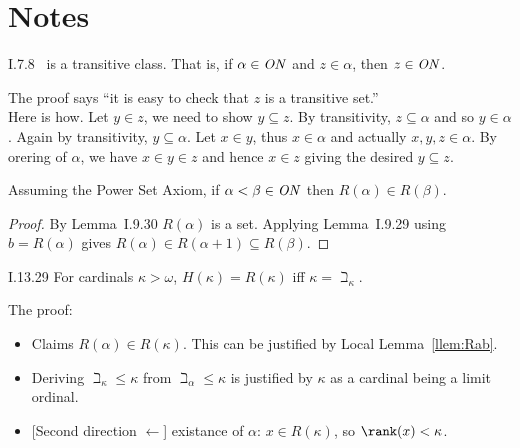 % 


\section{Notes}

\begin{manuallemma}{I.7.8}
\ON\ is a transitive class. That is, if \(\alpha \in \mathit{ON}\)
and \(z \in \alpha\),
then \(z \in \mathit{ON}\).
\end{manuallemma}
The proof says ``it is easy to check that $z$ is a transitive set.''
\\
Here is how. Let \(y \in z\), we need to show \(y \subseteq z\).
By transitivity, \(z \subseteq \alpha\) and so \(y \in \alpha\).
Again by transitivity, \(y \subseteq \alpha\).
Let \(x\in y\), thus \(x \in \alpha\) and actually \(x,y,z \in \alpha\).
By orering of \(\alpha\), we have \(x\in y \in z\) and hence \(x\in z\)
giving the desired \(y \subseteq z\).

\begin{llem} \label{llem:Rab}
Assuming the Power Set Axiom, if \(\alpha < \beta \in \mathit{ON}\)
then \(R(\alpha) \in R(\beta)\).
\end{llem}
\begin{proof}
By Lemma~I.9.30 \(R(\alpha)\) is a set.
Applying Lemma~I.9.29 using \(b=R(\alpha)\)
gives \(R(\alpha) \in R(\alpha + 1) \subseteq R(\beta)\).
\end{proof}

\begin{manuallemma}{I.13.29}
For cardinals \(\kappa > \omega\), \(H(\kappa) = R(\kappa)\)
iff \(\kappa = \beth_\kappa\).
\end{manuallemma}
The proof:
\begin{itemize}
\item
Claims \(R(\alpha) \in R(\kappa)\).
This can be justified by Local Lemma~\ref{llem:Rab}.
\item
Deriving \(\beth_\kappa \leq \kappa\)
from \(\beth_\alpha \leq \kappa\)
is justified by \(\kappa\) as a cardinal being a limit ordinal.
\item {}
[Second direction \(\leftarrow\)] existance of \(\alpha\):
\(x\in R(\kappa)\), so \(\rank(x)<\kappa\).
\unfinished
\end{itemize}

